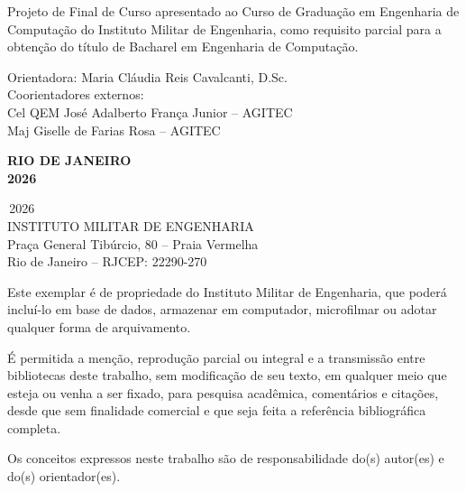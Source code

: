 \documentclass[12pt, a4paper]{article}
\begin{document}
\hfill
\begin{minipage}{0.55\textwidth}
  \fontsize{12}{16}\selectfont
  Projeto de Final de Curso apresentado ao Curso de
  Graduação em Engenharia de Computação do Instituto
  Militar de Engenharia, como requisito parcial para a
  obtenção do título de Bacharel em Engenharia de
  Computação.

  \vspace{0.4cm}
Orientadora: Maria Cláudia Reis Cavalcanti, D.Sc.\\

Coorientadores externos:\\
Cel QEM José Adalberto França Junior -- AGITEC\\
Maj Giselle de Farias Rosa -- AGITEC
\end{minipage}
\vfill

\begin{center}
  {\fontsize{12}{16}\selectfont\bfseries
    RIO DE JANEIRO \\
    2026
  }
\end{center}

\newpage

\noindent
\textcopyright\,2026 \\
INSTITUTO MILITAR DE ENGENHARIA \\
Praça General Tibúrcio, 80 -- Praia Vermelha \\
Rio de Janeiro -- RJ\quad CEP: 22290-270

\vspace{1.2cm}

\noindent
Este exemplar é de propriedade do Instituto Militar de Engenharia, que poderá
incluí-lo em base de dados, armazenar em computador, microfilmar ou adotar
qualquer forma de arquivamento.

\vspace{0.6cm}

\noindent
É permitida a menção, reprodução parcial ou integral e a transmissão entre
bibliotecas deste trabalho, sem modificação de seu texto, em qualquer meio que
esteja ou venha a ser fixado, para pesquisa acadêmica, comentários e citações,
desde que sem finalidade comercial e que seja feita a referência bibliográfica
completa.

\vspace{0.6cm}

\noindent
Os conceitos expressos neste trabalho são de responsabilidade do(s) autor(es)
e do(s) orientador(es).
\end{document}
